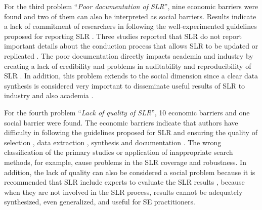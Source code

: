 \documentclass{article}
\begin{document}
For the third problem ``\textit{Poor documentation of SLR}'', nine economic barriers were found and two of them can also be interpreted as social barriers. Results indicate a lack of commitment of researchers in following the well-experimented guidelines proposed for reporting SLR \cite{Budgen2018Reporting}. Three studies reported that SLR do not report important details about the conduction process that allows SLR to be updated or replicated \cite{Budgen2018Reporting,Kitchenham2013,Riaz2010}. The poor documentation directly impacts academia and industry by creating a lack of credibility and problems in auditability and reproducibility of SLR \cite{Zhou2016Threats,Ampatzoglou2019,Riaz2010}. In addition, this problem extends to the social dimension since a clear data synthesis is considered very important to disseminate useful results of SLR to industry and also academia \cite{Budgen2018Reporting}. 

For the fourth problem ``\textit{Lack of quality of SLR}'', 10 economic barriers and one social barrier were found. The economic barriers indicate that authors have difficulty in following the guidelines proposed for SLR and ensuring the quality of selection \cite{Zhou2016Threats,Ampatzoglou2019}, data extraction \cite{Riaz2010,Ampatzoglou2019}, synthesis and documentation \cite{Budgen2018Reporting}. The wrong classification of the primary studies or application of inappropriate search methods, for example, cause problems in the SLR coverage and robustness. In addition, the lack of quality can also be considered a social problem because it is recommended that SLR include experts to evaluate the SLR results \cite{Kitchenham2013,Riaz2010,Zhou2016Threats}, because when they are not involved in the SLR process, results cannot be adequately synthesized, even generalized, and useful for SE practitioners.
\end{document}
